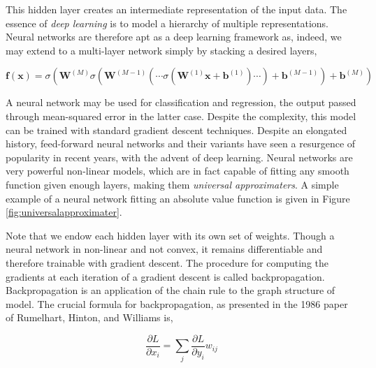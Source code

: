 This hidden layer creates an intermediate representation of the input data. The essence of \emph{deep learning} is to model a hierarchy of multiple representations. Neural networks are therefore apt as a deep learning framework as, indeed, we may extend to a multi-layer network simply by stacking a desired layers,

$$\mathbf{f}(\mathbf{x}) = \sigma(\mathbf{W}^{(M)}\sigma(\mathbf{W}^{(M-1)}(\cdots\sigma(\mathbf{W}^{(1)}\mathbf{x} + \mathbf{b}^{(1)})\cdots)  + \mathbf{b}^{(M-1)})  + \mathbf{b}^{(M)})$$

A neural network may be used for classification and regression, the output passed through mean-squared error in the latter case. Despite the complexity, this model can be trained with standard gradient descent techniques. Despite an elongated history, feed-forward neural networks and their variants have seen a resurgence of popularity in recent years, with the advent of deep learning. Neural networks are very powerful non-linear models, which are in fact capable of fitting any smooth function given enough layers, making them \emph{universal approximaters}. A simple example of a neural network fitting an absolute value function is given in Figure \ref{fig:universalapproximater}.


Note that we endow each hidden layer with its own set of weights. Though a neural network in non-linear and not convex, it remains differentiable and therefore trainable with gradient descent. The procedure for computing the gradients at each iteration of a gradient descent is called backpropagation. Backpropagation is an application of the chain rule to the graph structure of model. The crucial formula for backpropagation, as presented in the 1986 paper of Rumelhart, Hinton, and Williams is,

$$\frac{\partial L}{\partial x_i} = \sum_j \frac{\partial L}{\partial y_i} w_{ij}$$

